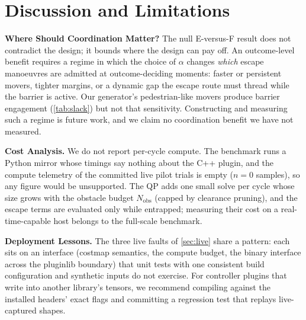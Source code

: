 \section{Discussion and Limitations}\label{sec:discussion}

\noindent\textbf{Where Should Coordination Matter?} The null E-versus-F result does not contradict the design; it bounds where the design can pay off. An outcome-level benefit requires a regime in which the choice of $\alpha$ changes \emph{which} escape manoeuvres are admitted at outcome-deciding moments: faster or persistent movers, tighter margins, or a dynamic gap the escape route must thread while the barrier is active. Our generator's pedestrian-like movers produce barrier engagement (\cref{tab:slack}) but not that sensitivity. Constructing and measuring such a regime is future work, and we claim no coordination benefit we have not measured.

\noindent\textbf{Cost Analysis.} We do not report per-cycle compute. The benchmark runs a Python mirror whose timings say nothing about the C++ plugin, and the compute telemetry of the committed live pilot trials is empty ($n=0$ samples), so any figure would be unsupported. The QP adds one small solve per cycle whose size grows with the obstacle budget $N_{\mathrm{obs}}$ (capped by clearance pruning), and the escape terms are evaluated only while entrapped; measuring their cost on a real-time-capable host belongs to the full-scale benchmark.

\noindent\textbf{Deployment Lessons.} The three live faults of \cref{sec:live} share a pattern: each sits on an interface (costmap semantics, the compute budget, the binary interface across the pluginlib boundary) that unit tests with one consistent build configuration and synthetic inputs do not exercise. For controller plugins that write into another library's tensors, we recommend compiling against the installed headers' exact flags and committing a regression test that replays live-captured shapes.


